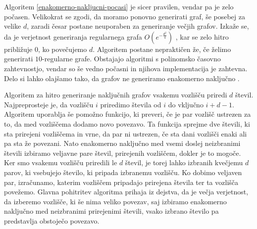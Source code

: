 Algoritem \ref{enakomerno-nakljucni-pocasi} je sicer pravilen, vendar pa je zelo počasen. Velikokrat se zgodi, da moramo ponovno generirati graf, še posebej za velike \(d\), zaradi česar postane neuporaben za generiranje večjih grafov. Izkaže se, da je verjetnost generiranja regularnega grafa \(O(e^{-\frac{d^2}{4}})\) \cite{STEGER_WORMALD_1999}, kar se zelo hitro približuje \(0\), ko povečujemo \(d\). Algoritem postane nepraktičen že, če želimo generirati \(10\)-regularne grafe. Obstajajo algoritmi s polinomsko časovno zahtevnostjo, vendar so še vedno počasni in njihova implementacija je zahtevna. Delo si lahko olajšamo tako, da grafov ne generiramo enakomerno naključno \cite{STEGER_WORMALD_1999}.

Algoritem za hitro generiranje naključnih grafov vsakemu vozlišču priredi \(d\) števil. Najpreprosteje je, da vozlišču \(i\) priredimo števila od \(i\) do vključno \(i+d-1\). Algoritem uporablja še pomožno funkcijo, ki preveri, če je par vozlišč ustrezen za to, da med vozliščema dodamo novo povezavo. Ta funkcija sprejme dve števili, ki sta prirejeni vozliščema in vrne, da par ni ustrezen, če sta dani vozlišči enaki ali pa sta že povezani. Nato enakomerno naključno med vsemi doslej neizbranimi števili izbiramo veljavne pare števil, prirejenih vozliščem, dokler je to mogoče. Ker smo vsakemu vozlišču priredili le \(d\) števil, je torej lahko izbranih kvečjemu \(d\) parov, ki vsebujejo število, ki pripada izbranemu vozlišču. Ko dobimo veljaven par, izračunamo, katerim vozliščem pripadajo prirejena števila ter ta vozlišča povežemo. Glavna pohitritev algoritma prihaja iz dejstva, da je večja verjetnost, da izberemo vozlišče, ki še nima veliko povezav, saj izbiramo enakomerno naključno med neizbranimi prirejenimi števili, vsako izbrano število pa predstavlja obstoječo povezavo.

